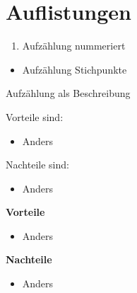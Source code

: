 \section{Auflistungen}
\begin{enumerate}
	\item Aufzählung nummeriert
\end{enumerate}

\begin{itemize}
	\item Aufzählung Stichpunkte
\end{itemize}

\begin{description}[style=nextline]
	\item[Label] Aufzählung als Beschreibung
\end{description}

Vorteile sind:
\begin{itemize}[noitemsep, topsep=0pt, partopsep=0pt, parsep=0pt]
  \item Anders
\end{itemize}

Nachteile sind:
\begin{itemize}[noitemsep, topsep=0pt, partopsep=0pt, parsep=0pt]
  \item Anders
\end{itemize}

\noindent
\begin{minipage}[t]{0.48\textwidth}
  \textbf{Vorteile}
  \begin{itemize}[nosep]
    \item Anders
  \end{itemize}
\end{minipage}\hfill
\begin{minipage}[t]{0.48\textwidth}
  \textbf{Nachteile}
  \begin{itemize}[nosep]
    \item Anders
  \end{itemize}
\end{minipage}